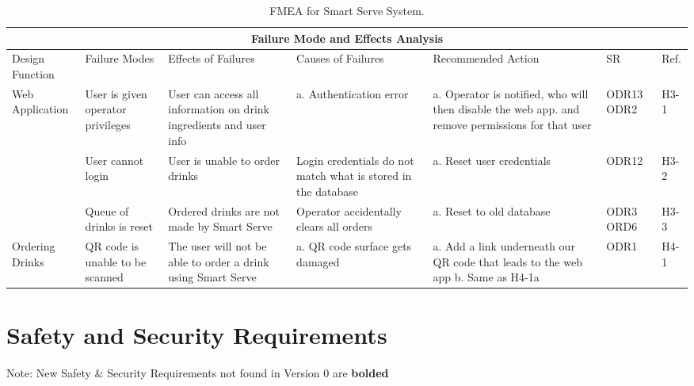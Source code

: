 \documentclass{article}
\begin{document}
    \begin{rotate}{}
    
    \begin{landscape}
        \begin{table}
           \begin{tabular}{|p{1.75cm}|p{4cm}|p{4cm}|p{4cm}|p{4cm}|p{1cm}|p{0.75cm}|}
            \hline
            \multicolumn{7}{|c|}{Failure Mode and Effects Analysis} \\
            \hline
            Design Function & Failure Modes & Effects of Failures & Causes of Failures & Recommended Action & SR & Ref.  \\ [0.5ex]
            
            \hline
            Web Application & User is given operator privileges & User can access all information on drink ingredients and user info & a. Authentication error & a. Operator is notified, who will then disable the web app. and remove permissions for that user & ODR13 ODR2 & H3-1 \\
            \cline{2-7}
             & User cannot login & User is unable to order drinks & Login credentials do not match what is stored in the database & a.  Reset user credentials & ODR12 & H3-2  \\
            \cline{2-7}
             & Queue of drinks is reset & Ordered drinks are not made by Smart Serve & Operator accidentally clears all orders & a.  Reset to old database & ODR3 ORD6 & H3-3  \\
            \hline
            Ordering Drinks & QR code is unable to be scanned & The user will not be able to order a drink using Smart Serve & \newline a. QR code surface gets damaged & a. Add a link underneath our QR code that leads to the web app \newline b. Same as H4-1a & ODR1 & H4-1\\
            \hline
            
            \end{tabular}
            \caption{FMEA for Smart Serve System.}
            \label{tab: caption}
        \end{table}
    \end{landscape}
    \end{rotate}

\section{Safety and Security Requirements}
    \noindent
    Note: New Safety & Security Requirements not found in Version 0 are \textbf{bolded}
\end{document}
